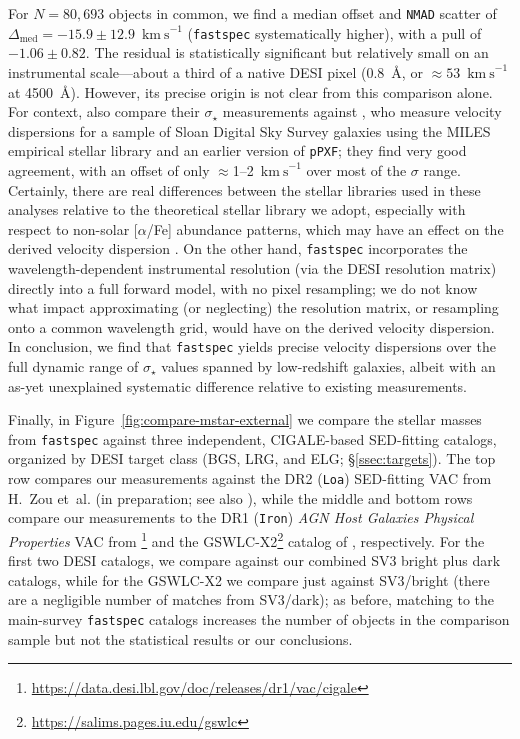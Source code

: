 \documentclass[modern,linenumbers]{aastex701}
\newcommand{\fastspec}{\texttt{fastspec}}
\newcommand{\kms}{\ensuremath{\mathrm{km~s}^{-1}}}
\newcommand{\vdisp}{\ensuremath{\sigma_\star}}
\begin{document}
For $N=80,693$ objects in common, we find a median offset and
\texttt{NMAD} scatter of $\Delta_\mathrm{med}=-15.9\pm12.9$~\kms{}
(\fastspec{} systematically higher), with a pull of
$-1.06\pm0.82$. The residual is statistically significant but
relatively small on an instrumental scale---about a third of a native
DESI pixel ($0.8$~\AA, or $\approx53$~\kms{} at 4500~\AA). However,
its precise origin is not clear from this comparison alone. For
context, \citet{ross25a} also compare their \vdisp{} measurements
against \citet{thomas13a}, who measure velocity dispersions for a
sample of Sloan Digital Sky Survey \citep[SDSS;][]{york00a} galaxies
using the MILES empirical stellar library \citep{sanchez-blazquez06a}
and an earlier version of \texttt{pPXF}; they find very good
agreement, with an offset of only $\approx$1--2~\kms{} over most of
the $\sigma$ range. Certainly, there are real differences between the
stellar libraries used in these analyses relative to the theoretical
stellar library we adopt, especially with respect to non-solar
[$\alpha$/Fe] abundance patterns, which may have an effect on the
derived velocity dispersion \citep[e.g.,][]{conroy14a, pernet24a}. On
the other hand, \fastspec{} incorporates the wavelength-dependent
instrumental resolution (via the DESI resolution matrix) directly into
a full forward model, with no pixel resampling; we do not know what
impact approximating (or neglecting) the resolution matrix, or
resampling onto a common wavelength grid, would have on the derived
velocity dispersion. In conclusion, we find that \fastspec{} yields
precise velocity dispersions over the full dynamic range of \vdisp{}
values spanned by low-redshift galaxies, albeit with an as-yet
unexplained systematic difference relative to existing measurements.

Finally, in Figure~\ref{fig:compare-mstar-external} we compare the
stellar masses from \fastspec{} against three independent,
CIGALE-based \citep{boquien19a} SED-fitting catalogs, organized by
DESI target class (BGS, LRG, and ELG; \S\ref{ssec:targets}). The
top row compares our measurements against the DR2 (\texttt{Loa})
SED-fitting VAC from H.~Zou et~al. (in preparation; see also
\citealt{zou24b, sui26a}), while the middle and bottom rows compare
our measurements to the DR1 (\texttt{Iron}) \textit{AGN Host Galaxies
  Physical Properties} VAC from
\citet[\texttt{v1.2};][]{siudek25a}\footnote{\url{https://data.desi.lbl.gov/doc/releases/dr1/vac/cigale}}
and the GSWLC-X2\footnote{\url{https://salims.pages.iu.edu/gswlc}}
catalog of \citet{salim16a, salim18a}, respectively. For the first two
DESI catalogs, we compare against our combined SV3 bright plus dark
catalogs, while for the GSWLC-X2 we compare just against SV3/bright
(there are a negligible number of matches from SV3/dark); as before,
matching to the main-survey \fastspec{} catalogs increases the number
of objects in the comparison sample but not the statistical results or
our conclusions.
\end{document}
